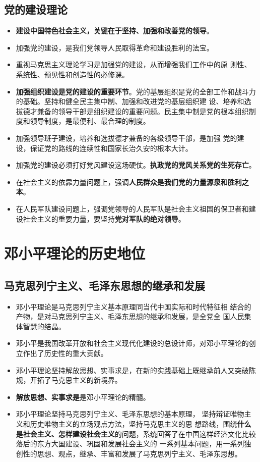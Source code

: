 \documentclass[12pt,openany]{ctexbook}
\begin{document}
\subsection{党的建设理论}
\begin{itemize}
  \item \textbf{建设中国特色社会主义，关键在于坚持、加强和改善党的领导}。
  \item 加强党的建设，是我们党领导人民取得革命和建设胜利的法宝。 
  \item 重视马克思主义理论学习是加强党的建设，从而增强我们工作中的原 则性、系统性、预见性和创造性的必修课。
  \item \textbf{加强组织建设是党的建设的重要环节}。党的基层组织是党的全部工作和战斗力的基础。坚持和健全民主集中制、加强和改进党的基层组织建 设、培养和选拔德才兼备的领导干部是组织建设的重要问题。民主集中制是党的根本组织制度和领导制度，是最便利、最合理的制度。
  \item 加强领导班子建设，培养和选拔德才兼备的各级领导干部，是加强 党的建设，保证党的路线的连续性和国家长治久安的根本大计。
  \item 加强党的建设必须打好党风建设这场硬仗。\textbf{执政党的党风关系党的生死存亡}。
  \item 在社会主义的依靠力量问题上，强调\textbf{人民群众是我们党的力量源泉和胜利之本}。
  \item 在人民军队建设问题上，强调党领导的人民军队是社会主义祖国的保卫者和建设社会主义的重要力量，要坚持\textbf{党对军队的绝对领导}。
\end{itemize}
\section{邓小平理论的历史地位}
\subsection{马克思列宁主义、毛泽东思想的继承和发展}
\begin{itemize}
  \item 邓小平理论是马克思列宁主义基本原理同当代中国实际和时代特征相 结合的产物，是对马克思列宁主义、毛泽东思想的继承和发展，是全党全 国人民集体智慧的结晶。
  \item 邓小平是我国改革开放和社会主义现代化建设的总设计师，对邓小平理论的创立作出了历史性的重大贡献。
  \item 邓小平理论坚持解放思想、实事求是，在新的实践基础上既继承前人又突破陈规，开拓了马克思主义的新境界。
  \item \textbf{解放思想、实事求是}是邓小平理论的精髓。
  \item 邓小平理论坚持马克思列宁主义、毛泽东思想的基本原理， 坚持辩证唯物主义和历史唯物主义的立场观点方法，坚持马克思主义的思 想路线，围绕\textbf{什么是社会主义、怎样建设社会主义}的问题，系统回答了在中国这样经济文化比较落后的东方大国建设、巩固和发展社会主义的 一系列基本问题，用一系列独创性的思想、观点，继承、丰富和发展了马克思列宁主义、毛泽东思想。
\end{itemize}
\end{document}
